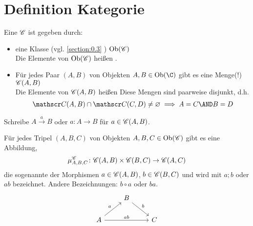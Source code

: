 \section*{Definition Kategorie}\label{section:1.2}
\setcounter{definition}{1}
\begin{definition} %
	Eine  $\mathscr C$ ist gegeben durch:
	\begin{itemize}
		\item eine Klasse (vgl. \ref{section:0.3}
		) $\operatorname{Ob}(\mathscr C)$\\
		Die Elemente von $\operatorname{Ob}(\mathscr C)$ heißen .
		\item Für jedes Paar $(A,B)$ von Objekten $A,B\in\Ob(\C)$ gibt es eine Menge(!) $\mathscr C(A,B)$\\
		Die Elemente von $\mathscr C(A,B)$ heißen  
		Diese Mengen sind paarweise disjunkt, d.h.
		\begin{align*}
			\Cat(A,B)\cap\Cat(C,D)\neq\emptyset
			\implies A=C\AND B=D
		\end{align*}
	\end{itemize}
\end{definition}

\begin{notation}
	Schreibe $A\overset{a}{\longrightarrow}B$ oder $a\colon A\to B$ für $a\in\mathscr C(A,B)$.
\end{notation}

\begin{lem}
	Für jedes Tripel $(A,B,C)$ von Objekten $A,B,C\in\operatorname{Ob}(\mathscr C)$ gibt es eine Abbildung, 
	\begin{align*}\index{Komposition}
		\mu_{A,B,C}^\Cat\colon\Cat(A,B)\times\Cat(B,C)\to\Cat(A,C)
	\end{align*}
	die sogenannte  der Morphismen $a\in\mathscr C(A,B)$, $b\in\mathscr C(B,C)$ und wird mit $a;b$ oder $ab$ bezeichnet.
	Andere Bezeichnungen: $b\circ a$ oder $ba$.
	$$
	\begin{tikzcd}
                                   & B \arrow[rd, "b"] &   \\
A \arrow[ru, "a"] \arrow[rr, "ab"] &                   & C
	\end{tikzcd}
	$$
\end{lem}

